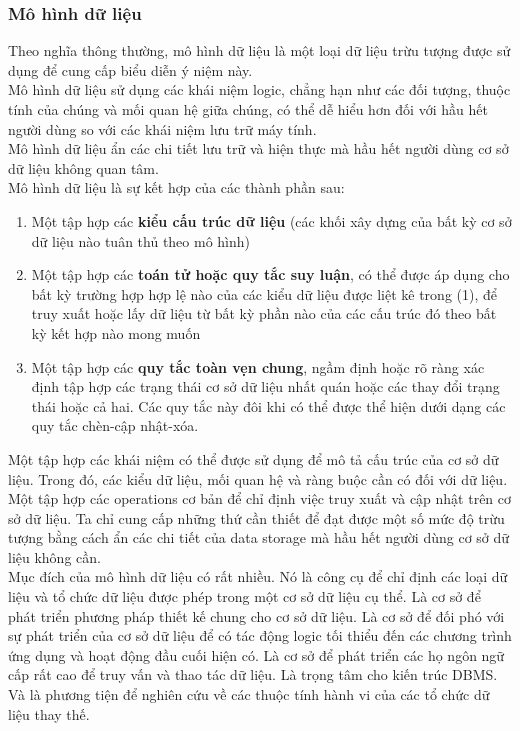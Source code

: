 \subsubsection{Mô hình dữ liệu}
\hspace*{0.5cm} Theo nghĩa thông thường, mô hình dữ liệu là một loại dữ liệu trừu tượng được sử dụng để cung cấp biểu diễn ý niệm này.\\
\hspace*{0.5cm} Mô hình dữ liệu sử dụng các khái niệm logic, chẳng hạn như các đối tượng, thuộc tính của chúng và mối quan hệ giữa chúng, có thể dễ hiểu hơn đối với hầu hết người dùng so với các khái niệm lưu trữ máy tính.\\
\hspace*{0.5cm} Mô hình dữ liệu ẩn các chi tiết lưu trữ và hiện thực mà hầu hết người dùng cơ sở dữ liệu không quan tâm.\\
\hspace*{0.5cm} Mô hình dữ liệu là sự kết hợp của các thành phần sau:
\begin{enumerate}
	\item Một tập hợp các \textbf{kiểu cấu trúc dữ liệu} (các khối xây dựng của bất kỳ cơ sở dữ liệu nào tuân thủ theo mô hình)
	\item Một tập hợp các \textbf{toán tử hoặc quy tắc suy luận}, có thể được áp dụng cho bất kỳ trường hợp hợp lệ nào của các kiểu dữ liệu được liệt kê trong (1), để truy xuất hoặc lấy dữ liệu từ bất kỳ phần nào của các cấu trúc đó theo bất kỳ kết hợp nào mong muốn
	\item Một tập hợp các \textbf{quy tắc toàn vẹn chung}, ngầm định hoặc rõ ràng xác định tập hợp các trạng thái cơ sở dữ liệu nhất quán hoặc các thay đổi trạng thái hoặc cả hai. Các quy tắc này đôi khi có thể được thể hiện dưới dạng các quy tắc chèn-cập nhật-xóa.
\end{enumerate}
\hspace*{0.5cm} Một tập hợp các khái niệm có thể được sử dụng để mô tả cấu trúc của cơ sở dữ liệu. Trong đó, các kiểu dữ liệu, mối quan hệ và ràng buộc cần có đối với dữ liệu. Một tập hợp các operations cơ bản để chỉ định việc truy xuất và cập nhật trên cơ sở dữ liệu. Ta chỉ cung cấp những thứ cần thiết để đạt được một số mức độ trừu tượng bằng cách ẩn các chi tiết của data storage mà hầu hết người dùng cơ sở dữ liệu không cần.\\
\hspace*{0.5cm} Mục đích của mô hình dữ liệu có rất nhiều. Nó là công cụ để chỉ định các loại dữ liệu và tổ chức dữ liệu được phép trong một cơ sở dữ liệu cụ thể. Là cơ sở để phát triển phương pháp thiết kế chung cho cơ sở dữ liệu. Là cơ sở để đối phó với sự phát triển của cơ sở dữ liệu để có tác động logic tối thiểu đến các chương trình ứng dụng và hoạt động đầu cuối hiện có. Là cơ sở để phát triển các họ ngôn ngữ cấp rất cao để truy vấn và thao tác dữ liệu. Là trọng tâm cho kiến trúc DBMS. Và là phương tiện để nghiên cứu về các thuộc tính hành vi của các tổ chức dữ liệu thay thế.\\
